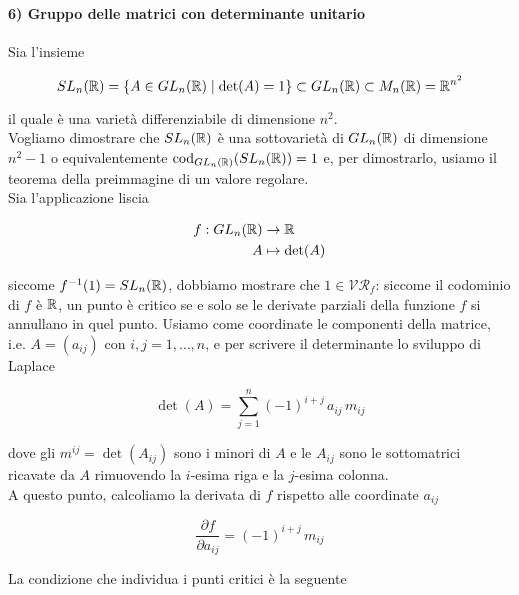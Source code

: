 \paragraph{6) Gruppo delle matrici con determinante unitario}\label{SL-subvar}

Sia l'insieme

\begin{equation}
	SL_{n}(\mathbb{R}) = \{ A \in GL_{n}(\mathbb{R}) \mid \det(A) = 1 \} \subset GL_{n}(\mathbb{R}) \subset M_{n}(\mathbb{R}) = \mathbb{R}^{n^{2}}
\end{equation}

il quale è una varietà differenziabile di dimensione $ n^{2} $.\\
Vogliamo dimostrare che $ SL_{n}(\mathbb{R}) $ è una sottovarietà di $ GL_{n}(\mathbb{R}) $ di dimensione $ n^{2}-1 $ o equivalentemente $ \operatorname{cod}_{GL_{n}(\mathbb{R})}(SL_{n}(\mathbb{R})) = 1 $ e, per dimostrarlo, usiamo il teorema della preimmagine di un valore regolare.\\
Sia l'applicazione liscia

\begin{align}
	\begin{split}
		f : GL_{n}(\mathbb{R}) &\to \mathbb{R}\\
		A &\mapsto \det(A)
	\end{split}
\end{align}

siccome $ f^{-1}(1) = SL_{n}(\mathbb{R}) $, dobbiamo mostrare che $ 1 \in \mathcal{VR}_{f} $: siccome il codominio di $ f $ è $ \mathbb{R} $, un punto è critico se e solo se le derivate parziali della funzione $ f $ si annullano in quel punto. Usiamo come coordinate le componenti della matrice, i.e. $ A = (a_{ij}) $ con $ i,j=1,\dots,n $, e per scrivere il determinante lo sviluppo di Laplace

\begin{equation}
	\det(A) = \sum_{j=1}^{n} (-1)^{i+j} \, a_{ij} \, m_{ij}
\end{equation}

dove gli $ m^{ij} = \det(A_{ij}) $ sono i minori di $ A $ e le $ A_{ij} $ sono le sottomatrici ricavate da $ A $ rimuovendo la $ i $-esima riga e la $ j $-esima colonna.\\
A questo punto, calcoliamo la derivata di $ f $ rispetto alle coordinate $ a_{ij} $

\begin{equation}
	\dfrac{\partial f}{\partial a_{ij}} = (-1)^{i+j} \, m_{ij}
\end{equation}

La condizione che individua i punti critici è la seguente

